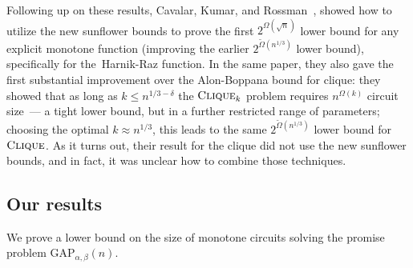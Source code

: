 \documentclass[10pt,a4paper]{article}
\newenvironment{comment}{}{}
\newcommand{\cliquep}{\textsc{Clique}}
\newcommand{\jnote}[1]{\todo[inline,backgroundcolor=blue!20!green]{#1 \\ \textsc{--Jarek}}}
\newcommand{\lnote}[1]{\todo[inline,backgroundcolor=blue!20!yellow]{#1 \\ \textsc{--Linus}}}
\begin{document}
Following up on these results, Cavalar, Kumar, and Rossman~\cite{cavalar2022}, showed how to utilize the new sunflower bounds to prove the first $2^{\Omega(\sqrt{n})}$ lower bound for any explicit monotone function (improving the earlier $2^{\tilde{\Omega}(n^{1/3})}$ lower bound), specifically for the~Harnik-Raz function\cite{harnik00lower}. In the same paper, they also gave the first substantial improvement over the Alon-Boppana bound for clique: they showed that as long as $k \leq n^{1/3 - \delta}$ the $\cliquep_k$ problem requires $n^{\Omega(k)}$ circuit size~--- a tight lower bound, but in a further restricted range of parameters; choosing the optimal $k \approx n^{1/3}$, this leads to the same $2^{\tilde{\Omega}(n^{1/3})}$ lower bound for $\cliquep$. As it turns out, their result for the clique did not use the new sunflower bounds, and in fact, it was unclear how to combine those techniques.

\subsection{Our results}


We prove a lower bound on the size of monotone circuits solving the promise problem $\mathrm{GAP}_{\alpha, \beta}(n)$.
\end{document}

